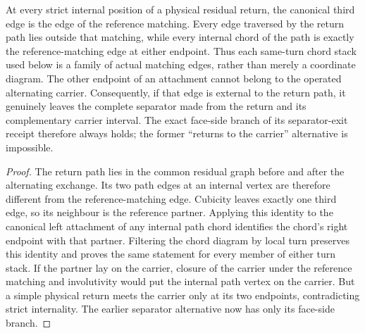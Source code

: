 \begin{lemma}
\label{lem:residual-return-attachment-matching-role}
At every strict internal position of a physical residual return, the canonical
third edge is the edge of the reference matching.  Every edge traversed by the
return path lies outside that matching, while every internal chord of the path
is exactly the reference-matching edge at either endpoint.  Thus each
same-turn chord stack used below is a family of actual matching edges, rather
than merely a coordinate diagram.  The other endpoint of an attachment cannot
belong to the operated alternating carrier.  Consequently, if that edge is
external to the return path, it genuinely leaves the complete separator made
from the return and its complementary carrier interval.  The exact face-side
branch of its separator-exit receipt therefore always holds; the former
``returns to the carrier'' alternative is impossible.
\end{lemma}

\begin{proof}
The return path lies in the common residual graph before and after the
alternating exchange.  Its two path edges at an internal vertex are therefore
different from the reference-matching edge.  Cubicity leaves exactly one
third edge, so its neighbour is the reference partner.  Applying this identity
to the canonical left attachment of any internal path chord identifies the
chord's right endpoint with that partner.  Filtering the chord diagram by
local turn preserves this identity and proves the same statement for every
member of either turn stack.  If the partner lay on the carrier, closure of
the carrier under the reference matching and involutivity would put the
internal path vertex on the carrier.  But a simple physical return meets the
carrier only at its two endpoints, contradicting strict internality.  The
earlier separator alternative now has only its face-side branch.
\end{proof}

